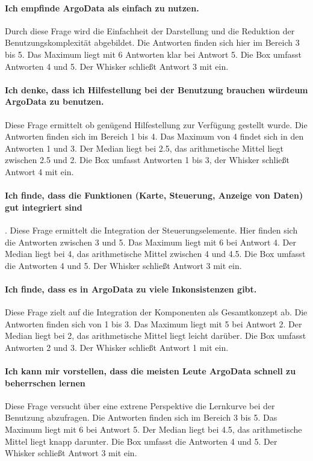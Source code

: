   \paragraph{Ich empfinde ArgoData als einfach zu nutzen.}
    Durch diese Frage wird die Einfachheit der Darstellung und die Reduktion der Benutzungskomplexität abgebildet. Die Antworten finden sich hier im Bereich 3 bis 5. Das Maximum liegt mit 6 Antworten klar bei Antwort 5. Die Box umfasst Antworten 4 und 5. Der Whisker schließt Antwort 3 mit ein.

\paragraph{Ich denke, dass ich Hilfestellung bei der Benutzung brauchen würde\newline um ArgoData zu benutzen.}
    Diese Frage ermittelt ob genügend Hilfestellung zur Verfügung gestellt wurde.  Die Antworten finden sich im Bereich 1 bis 4. Das Maximum von 4 findet sich in den Antworten 1 und 3.  Der Median liegt bei 2.5, das arithmetische Mittel liegt zwischen 2.5 und 2. Die Box umfasst Antworten 1 bis 3, der Whisker schließt Antwort 4 mit ein.

\paragraph{Ich finde, dass die Funktionen (Karte, Steuerung, Anzeige von Daten) gut integriert sind}. 
    Diese Frage ermittelt die Integration der Steuerungselemente. Hier finden sich die Antworten zwischen 3 und 5. Das Maximum liegt mit 6 bei Antwort 4. Der Median liegt bei 4, das arithmetische Mittel zwischen 4 und 4.5. Die Box umfasst  die Antworten 4 und 5. Der Whisker schließt Antwort 3 mit ein.
    
\paragraph{Ich finde, dass es in ArgoData zu viele Inkonsistenzen gibt.}
    Diese Frage zielt auf die Integration der Komponenten als Gesamtkonzept ab. Die Antworten finden sich von 1 bis 3. Das Maximum liegt mit 5 bei Antwort 2. Der Median liegt bei 2, das arithmetische Mittel liegt leicht darüber. Die Box umfasst Antworten 2 und 3. Der Whisker schließt Antwort 1 mit ein.
    
\paragraph{Ich kann mir vorstellen, dass die meisten Leute ArgoData schnell zu beherrschen lernen} 
    Diese Frage versucht über eine extrene Perspektive die Lernkurve bei der Benutzung abzufragen. Die Antworten finden sich im Bereich 3 bis 5. Das Maximum liegt mit 6 bei Antwort 5. Der Median liegt bei 4.5, das arithmetische Mittel liegt knapp darunter. Die Box umfasst die Antworten 4 und 5. Der Whisker schließt Antwort 3 mit ein.

